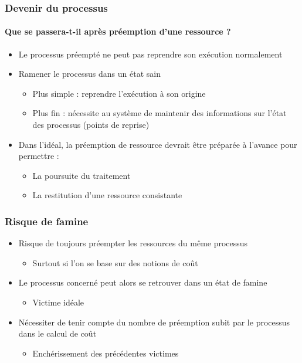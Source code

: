 \begin{frame}
\frametitle{Devenir du processus}
\framesubtitle{Que se passera-t-il après préemption d’une ressource ?}
\begin{itemize}
\item <1->Le processus préempté ne peut pas reprendre son exécution normalement
\item <2->Ramener le processus dans un état sain
\begin{itemize}
\item Plus simple : reprendre l’exécution à son origine
\item Plus fin : nécessite au système de maintenir des informations sur l’état des processus (points de reprise)
\end{itemize}
\item <3->Dans l'idéal, la préemption de ressource devrait être préparée à l'avance pour permettre :
\begin{itemize}
\item La poursuite du traitement
\item La restitution d'une ressource consistante
\end{itemize}
\end{itemize}
\end{frame}

\begin{frame}
\frametitle{Risque de famine}
\begin{itemize}
\item <1->Risque de toujours préempter les ressources du même processus
\begin{itemize}
\item Surtout si l’on se base sur des notions de coût
\end{itemize}
\item <2-> Le processus concerné peut alors se retrouver dans un état de famine
\begin{itemize}
\item Victime idéale
\end{itemize}
\item <3->Nécessiter de tenir compte du nombre de préemption subit par le processus dans le calcul de coût
\begin{itemize}
\item Enchérissement des précédentes victimes
\end{itemize}
\end{itemize}
\end{frame}

